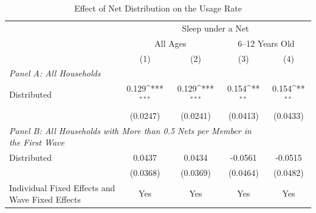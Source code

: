 \documentclass[fleqn,11pt]{article}
\newcommand{\sym}[1]{\rlap{$#1$}}
\def\sym#1{\ifmmode^{#1}\else\(^{#1}\)\fi
}
\begin{document}
\begin{table}[h]
\caption{Effect of Net Distribution on the Usage Rate}
\label{mqnidd3rd_child}
\centering
\begin{adjustbox}{max width=\textwidth}
\begin{threeparttable}
\begin{tabular}{l*{4}{c}}
\hline\hline
	&\multicolumn{4}{c}{Sleep under a Net}\\  \cmidrule(lr){2-5}
	&\multicolumn{2}{c}{All Ages}&\multicolumn{2}{c}{6--12 Years Old}\\ \cmidrule(lr){2-3}  \cmidrule(lr){4-5}
                    &\multicolumn{1}{c}{(1)}&\multicolumn{1}{c}{(2)}&\multicolumn{1}{c}{(3)}&\multicolumn{1}{c}{(4)}\\
    \multicolumn{4}{l}{\textit{Panel A: All Households}}  \\ \hline
Distributed         &       0.129\sym{***}&       0.129\sym{***}&       0.154\sym{**} &       0.154\sym{**} \\
                    &    (0.0247)         &    (0.0241)         &    (0.0413)         &    (0.0433)         \\
   \multicolumn{4}{l}{\textit{Panel B: All Households with More than 0.5 Nets per Member in the First Wave}} \\ \hline
Distributed         &      0.0437         &      0.0434         &     -0.0561         &     -0.0515         \\
                    &      (0.0368)         &      (0.0369)         &      (0.0464)         &      (0.0482)         \\


Individual Fixed Effects and Wave Fixed Effects &         Yes         &         Yes         &         Yes         &         Yes         \\


\end{tabular}
\end{threeparttable}
\end{adjustbox}
\end{table}
\end{document}
